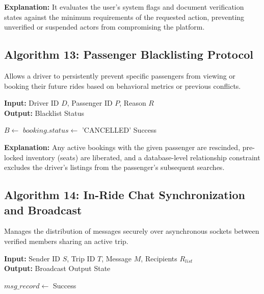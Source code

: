 \textbf{Explanation:} It evaluates the user's system flags and document verification states against the minimum requirements of the requested action, preventing unverified or suspended actors from compromising the platform.

\subsection{Algorithm 13: Passenger Blacklisting Protocol}

Allows a driver to persistently prevent specific passengers from viewing or booking their future rides based on behavioral metrics or previous conflicts.

\begin{algorithm}[H]
\caption{Driver-Initiated Passenger Blacklisting}
\textbf{Input:} Driver ID $D$, Passenger ID $P$, Reason $R$ \\
\textbf{Output:} Blacklist Status
\begin{algorithmic}[1]
    \State {}
    \State {}
    \State $B \gets$ 
        \State $booking.status \gets$ 'CANCELLED'
        \State {}
    \EndFor
    \State {}
    \State \Return Success
\EndFunction
\end{algorithmic}
\end{algorithm}

\textbf{Explanation:} Any active bookings with the given passenger are rescinded, pre-locked inventory (seats) are liberated, and a database-level relationship constraint excludes the driver's listings from the passenger's subsequent searches.

\subsection{Algorithm 14: In-Ride Chat Synchronization and Broadcast}

Manages the distribution of messages securely over asynchronous sockets between verified members sharing an active trip.

\begin{algorithm}[H]
\caption{Chat Synchronization and Broadcast}
\textbf{Input:} Sender ID $S$, Trip ID $T$, Message $M$, Recipients $R_{list}$ \\
\textbf{Output:} Broadcast Output State
\begin{algorithmic}[1]
    \State $msg\_record \gets$ 
        \State {}
            \State {}
        \EndIf
    \EndFor
    \State \Return Success
\EndFunction
\end{algorithmic}
\end{algorithm}

